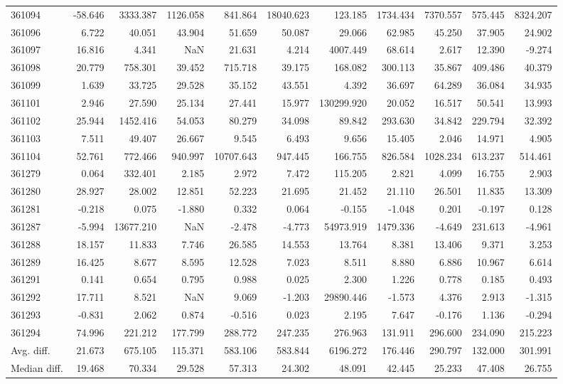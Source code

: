 \begin{tabular}{lrrrrrrrrrr}
361094 & -58.646 & 3333.387 & 1126.058 & 841.864 & 18040.623 & 123.185 & 1734.434 & 7370.557 & 575.445 & 8324.207 \\
361096 & 6.722 & 40.051 & 43.904 & 51.659 & 50.087 & 29.066 & 62.985 & 45.250 & 37.905 & 24.902 \\
361097 & 16.816 & 4.341 & NaN & 21.631 & 4.214 & 4007.449 & 68.614 & 2.617 & 12.390 & -9.274 \\
361098 & 20.779 & 758.301 & 39.452 & 715.718 & 39.175 & 168.082 & 300.113 & 35.867 & 409.486 & 40.379 \\
361099 & 1.639 & 33.725 & 29.528 & 35.152 & 43.551 & 4.392 & 36.697 & 64.289 & 36.084 & 34.935 \\
361101 & 2.946 & 27.590 & 25.134 & 27.441 & 15.977 & 130299.920 & 20.052 & 16.517 & 50.541 & 13.993 \\
361102 & 25.944 & 1452.416 & 54.053 & 80.279 & 34.098 & 89.842 & 293.630 & 34.842 & 229.794 & 32.392 \\
361103 & 7.511 & 49.407 & 26.667 & 9.545 & 6.493 & 9.656 & 15.405 & 2.046 & 14.971 & 4.905 \\
361104 & 52.761 & 772.466 & 940.997 & 10707.643 & 947.445 & 166.755 & 826.584 & 1028.234 & 613.237 & 514.461 \\
361279 & 0.064 & 332.401 & 2.185 & 2.972 & 7.472 & 115.205 & 2.821 & 4.099 & 16.755 & 2.903 \\
361280 & 28.927 & 28.002 & 12.851 & 52.223 & 21.695 & 21.452 & 21.110 & 26.501 & 11.835 & 13.309 \\
361281 & -0.218 & 0.075 & -1.880 & 0.332 & 0.064 & -0.155 & -1.048 & 0.201 & -0.197 & 0.128 \\
361287 & -5.994 & 13677.210 & NaN & -2.478 & -4.773 & 54973.919 & 1479.336 & -4.649 & 231.613 & -4.961 \\
361288 & 18.157 & 11.833 & 7.746 & 26.585 & 14.553 & 13.764 & 8.381 & 13.406 & 9.371 & 3.253 \\
361289 & 16.425 & 8.677 & 8.595 & 12.528 & 7.023 & 8.511 & 8.880 & 6.886 & 10.967 & 6.614 \\
361291 & 0.141 & 0.654 & 0.795 & 0.988 & 0.025 & 2.300 & 1.226 & 0.778 & 0.185 & 0.493 \\
361292 & 17.711 & 8.521 & NaN & 9.069 & -1.203 & 29890.446 & -1.573 & 4.376 & 2.913 & -1.315 \\
361293 & -0.831 & 2.062 & 0.874 & -0.516 & 0.023 & 2.195 & 7.647 & -0.176 & 1.136 & -0.294 \\
361294 & 74.996 & 221.212 & 177.799 & 288.772 & 247.235 & 276.963 & 131.911 & 296.600 & 234.090 & 215.223 \\
Avg. diff. & 21.673 & 675.105 & 115.371 & 583.106 & 583.844 & 6196.272 & 176.446 & 290.797 & 132.000 & 301.991 \\
Median diff. & 19.468 & 70.334 & 29.528 & 57.313 & 24.302 & 48.091 & 42.445 & 25.233 & 47.408 & 26.755 \\
\bottomrule
\end{tabular}
